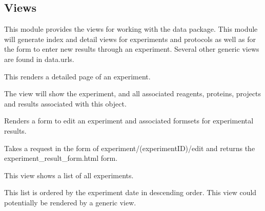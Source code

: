 \documentclass[letterpaper,10pt,english]{sphinxmanual}
\begin{document}
\subsection{Views}
\label{api:module-experimentdb.data.views}\label{api:views}
This module provides the views for working with the data package.
This module will generate index and detail views for experiments and protocols as well as for the form to enter new results through an experiment.  Several other generic views are found in data.urls.

\begin{fulllineitems}
\label{api:experimentdb.data.views.experiment}
This renders a detailed page of an experiment.

The view will show the experiment, and all associated reagents, proteins, projects and results associated with this object.

\end{fulllineitems}


\begin{fulllineitems}
\label{api:experimentdb.data.views.experiment_edit}
Renders a form to edit an experiment and associated formsets for experimental results.

Takes a request in the form of experiment/(experimentID)/edit and returns the experiment\_result\_form.html form.

\end{fulllineitems}


\begin{fulllineitems}
\label{api:experimentdb.data.views.index}
This view shows a list of all experiments.

This list is ordered by the experiment date in descending order.  This view could potentially be rendered by a generic view.

\end{fulllineitems}
\end{document}

